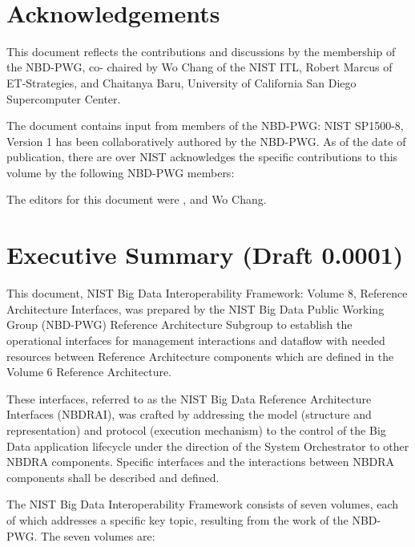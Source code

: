 \documentclass[11pt]{article}
\newcommand{\TODO}[1]{\todo{#1}}
\begin{document}
 
\section*{Acknowledgements}

This document reflects the contributions and discussions by the membership of the NBD-PWG, co-
chaired by Wo Chang of the NIST ITL, Robert Marcus of ET-Strategies, and Chaitanya Baru, University 
of California San Diego Supercomputer Center. 

The document contains input from members of the NBD-PWG: \TODO{TBD}
NIST SP1500-8, Version 1 has been collaboratively authored by the NBD-PWG. As of the date of 
publication, there are over \TODO{TBD}
NIST acknowledges the specific contributions  to this volume by the following NBD-PWG members:
\TODO{TBD}

The editors for this document were \TODO{TBD}, and Wo Chang.

\newpage
{}

\section{Executive Summary (Draft 0.0001)}

This document, NIST Big Data Interoperability Framework: Volume 8, Reference Architecture Interfaces, 
was prepared by the NIST Big Data Public Working Group (NBD-PWG) Reference Architecture 
Subgroup to establish the operational interfaces for management interactions and dataflow with needed 
resources between Reference Architecture components which are defined in the Volume 6 Reference 
Architecture. 

These interfaces, referred to as the NIST Big Data Reference Architecture Interfaces (NBDRAI), was 
crafted by addressing the model (structure and representation) and protocol (execution mechanism) to the 
control of the Big Data application lifecycle under the direction of the System Orchestrator to other 
NBDRA components. Specific interfaces and the interactions between NBDRA components shall be 
described and defined.

The NIST Big Data Interoperability Framework consists of seven volumes, each of which addresses a 
specific key topic, resulting from the work of the NBD-PWG. The seven volumes are:
\end{document}
